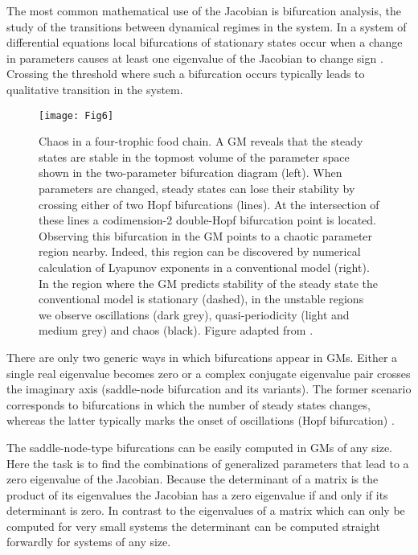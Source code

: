 \documentclass{article}
\begin{document}
The most common mathematical use of the Jacobian is bifurcation analysis, the study of the transitions between dynamical regimes in the system. In a system of differential equations local bifurcations of stationary states occur when a change in parameters causes at least one eigenvalue of the Jacobian to change sign \citep{Guckenheimer,Kuznetsov}. Crossing the threshold where such a bifurcation occurs typically leads to qualitative transition in the system.  

\begin{figure}
    \centering
    \texttt{[image: Fig6]}
    \caption{Chaos in a four-trophic food chain. A GM reveals that the steady states are stable in the topmost volume of the parameter space shown in the two-parameter bifurcation diagram (left). When parameters are changed, steady states can lose their stability by crossing either of two Hopf bifurcations (lines). At the intersection of these lines a codimension-2 double-Hopf bifurcation point is located. Observing this bifurcation in the GM points to a chaotic parameter region nearby. Indeed, this region can be discovered by numerical calculation of Lyapunov exponents in a conventional model (right). In the region where the GM predicts stability of the steady state the conventional model is stationary (dashed), in the unstable regions we observe oscillations (dark grey), quasi-periodicity (light and medium grey) and chaos (black). 
    Figure adapted from \cite{Gross2005OIKOS}.}
    \label{figchaos}
\end{figure}

There are only two generic ways in which bifurcations appear in GMs. Either a single real eigenvalue becomes zero or a complex conjugate eigenvalue pair crosses the imaginary axis (saddle-node bifurcation and its variants). The former scenario corresponds to bifurcations in which the number of steady states changes, whereas the latter typically marks the onset of oscillations (Hopf bifurcation) \citep{guckenheimer1997computing}.

The saddle-node-type bifurcations can be easily computed in GMs of any size. Here the task is to find the combinations of generalized parameters that lead to a zero eigenvalue of the Jacobian. Because the determinant of a matrix is the product of its eigenvalues \citep{Gantmacher} the Jacobian has a zero eigenvalue if and only if its determinant is zero. In contrast to the eigenvalues of a matrix which can only be computed for very small systems the determinant can be computed straight forwardly for systems of any size. 
\end{document}
